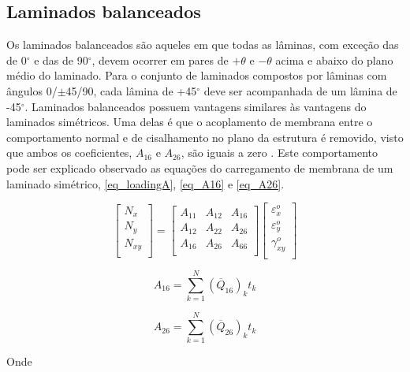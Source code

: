 \subsection{Laminados balanceados}
Os laminados balanceados são aqueles em que todas as lâminas, com exceção das de 0$^{\circ}$ e das de 90$^{\circ}$, devem ocorrer em pares de $ +\theta $ e $ -\theta $ acima e abaixo do plano médio do laminado. Para o conjunto de laminados compostos por lâminas com ângulos 0/$\pm$45/90, cada lâmina de +45$^{\circ}$ deve ser acompanhada de um lâmina de -45$^{\circ}$.
Laminados balanceados possuem vantagens similares às vantagens do laminados simétricos. Uma delas é que o acoplamento de membrana entre o comportamento normal e de cisalhamento no plano da estrutura é removido, visto que ambos os coeficientes, $ A_{16} $ e $ A_{26} $, são iguais a zero \cite{nasa1997guidelines}. Este comportamento pode ser explicado observado as equações do carregamento de membrana de um laminado simétrico, \autoref{eq_loadingA}, \autoref{eq_A16} e \autoref{eq_A26}.

\begin{equation} \label{eq_loadingA}
\begin{bmatrix}
    N_{x} \\
    N_{y} \\
    N_{xy} \\
\end{bmatrix}
=
\begin{bmatrix}
    A_{11} & A_{12} & A_{16}\\
    A_{12} & A_{22} & A_{26}\\
    A_{16} & A_{26} & A_{66}\\
\end{bmatrix}
\begin{bmatrix}
    \varepsilon_{x}^o \\
    \varepsilon_{y}^o \\
    \gamma_{xy}^o \\
\end{bmatrix}
\end{equation}

\begin{equation} \label{eq_A16}
A_{16}
=
\sum_{k=1}^N (\overline{Q}_{16})_k t_k
\end{equation}

\begin{equation} \label{eq_A26}
A_{26}
=
\sum_{k=1}^N (\overline{Q}_{26})_k t_k
\end{equation}

Onde

